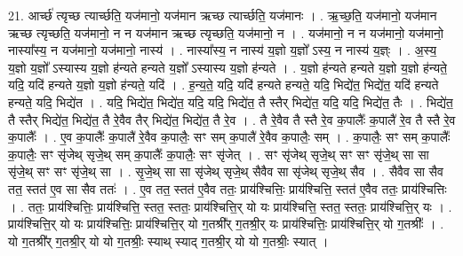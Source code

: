 \documentclass[17pt]{extarticle}
\begin{document}
21. आर्च्छ॑ त्यृच्छ त्यार्च्छति॒ यज॑मानो॒ यज॑मान ऋच्छ त्यार्च्छति॒ यज॑मानः । . ऋ॒च्छ॒ति॒ यज॑मानो॒ यज॑मान ऋच्छ त्यृच्छति॒ यज॑मानो॒ न न यज॑मान ऋच्छ त्यृच्छति॒ यज॑मानो॒ न । . यज॑मानो॒ न न यज॑मानो॒ यज॑मानो॒ नास्या᳚स्य॒ न यज॑मानो॒ यज॑मानो॒ नास्य॑ । . नास्या᳚स्य॒ न नास्य॑ य॒ज्ञो य॒ज्ञो᳚ ऽस्य॒ न नास्य॑ य॒ज्ञ्ः । . अ॒स्य॒ य॒ज्ञो य॒ज्ञो᳚ ऽस्यास्य य॒ज्ञो ह॑न्यते हन्यते य॒ज्ञो᳚ ऽस्यास्य य॒ज्ञो ह॑न्यते । . य॒ज्ञो ह॑न्यते हन्यते य॒ज्ञो य॒ज्ञो ह॑न्यते॒ यदि॒ यदि॑ हन्यते य॒ज्ञो य॒ज्ञो ह॑न्यते॒ यदि॑ । . ह॒न्य॒ते॒ यदि॒ यदि॑ हन्यते हन्यते॒ यदि॒ भिद्ये॑त॒ भिद्ये॑त॒ यदि॑ हन्यते हन्यते॒ यदि॒ भिद्ये॑त । . यदि॒ भिद्ये॑त॒ भिद्ये॑त॒ यदि॒ यदि॒ भिद्ये॑त॒ तै स्तैर् भिद्ये॑त॒ यदि॒ यदि॒ भिद्ये॑त॒ तैः । . भिद्ये॑त॒ तै स्तैर् भिद्ये॑त॒ भिद्ये॑त॒ तै रे॒वैव तैर् भिद्ये॑त॒ भिद्ये॑त॒ तै रे॒व । . तै रे॒वैव तै स्तै रे॒व क॒पालैः᳚ क॒पालै॑ रे॒व तै स्तै रे॒व क॒पालैः᳚ । . ए॒व क॒पालैः᳚ क॒पालै॑ रे॒वैव क॒पालैः॒ सꣳ सम् क॒पालै॑ रे॒वैव क॒पालैः॒ सम् । . क॒पालैः॒ सꣳ सम् क॒पालैः᳚ क॒पालैः॒ सꣳ सृ॑जेथ् सृजे॒थ् सम् क॒पालैः᳚ क॒पालैः॒ सꣳ सृ॑जेत् । . सꣳ सृ॑जेथ् सृजे॒थ् सꣳ सꣳ सृ॑जे॒थ् सा सा सृ॑जे॒थ् सꣳ सꣳ सृ॑जे॒थ् सा । . सृ॒जे॒थ् सा सा सृ॑जेथ् सृजे॒थ् सैवैव सा सृ॑जेथ् सृजे॒थ् सैव । . सैवैव सा सैव तत॒ स्तत॑ ए॒व सा सैव ततः॑ । . ए॒व तत॒ स्तत॑ ए॒वैव ततः॒ प्राय॑श्चित्तिः॒ प्राय॑श्चित्ति॒ स्तत॑ ए॒वैव ततः॒ प्राय॑श्चित्तिः । . ततः॒ प्राय॑श्चित्तिः॒ प्राय॑श्चित्ति॒ स्तत॒ स्ततः॒ प्राय॑श्चित्ति॒र् यो यः प्राय॑श्चित्ति॒ स्तत॒ स्ततः॒ प्राय॑श्चित्ति॒र् यः । . प्राय॑श्चित्ति॒र् यो यः प्राय॑श्चित्तिः॒ प्राय॑श्चित्ति॒र् यो ग॒तश्री᳚र् ग॒तश्री॒र् यः प्राय॑श्चित्तिः॒ प्राय॑श्चित्ति॒र् यो ग॒तश्रीः᳚ । . यो ग॒तश्री᳚र् ग॒तश्री॒र् यो यो ग॒तश्रीः॒ स्याथ् स्याद् ग॒तश्री॒र् यो यो ग॒तश्रीः॒ स्यात् । \newline
\end{document}
